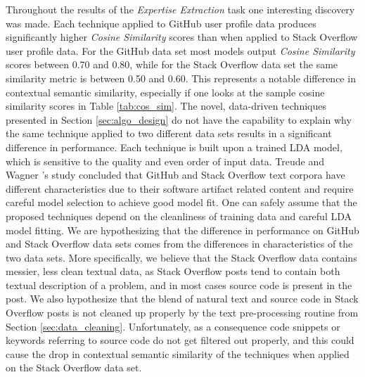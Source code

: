         Throughout the results of the \emph{Expertise Extraction} task one interesting discovery was made. Each technique applied to GitHub user profile data produces significantly higher \emph{Cosine Similarity} scores than when applied to Stack Overflow user profile data. For the GitHub data set most models output \emph{Cosine Similarity} scores between 0.70 and 0.80, while for the Stack Overflow data set the same similarity metric is between 0.50 and 0.60. This represents a notable difference in contextual semantic similarity, especially if one looks at the sample cosine similarity scores in Table \ref{tab:cos_sim}. The novel, data-driven techniques presented in Section \ref{sec:algo_design} do not have the capability to explain why the same technique applied to two different data sets results in a significant difference in performance. Each technique is built upon a trained LDA model, which is sensitive to the quality and even order of input data. Treude and Wagner \cite{treude2019predicting}'s study concluded that GitHub and Stack Overflow text corpora have different characteristics due to their software artifact related content and require careful model selection to achieve good model fit. One can safely assume that the proposed techniques depend on the cleanliness of training data and careful LDA model fitting. We are hypothesizing that the difference in performance on GitHub and Stack Overflow data sets comes from the differences in characteristics of the two data sets. More specifically, we believe that the Stack Overflow data contains messier, less clean textual data, as Stack Overflow posts tend to contain both textual description of a problem, and in most cases source code is present in the post. We also hypothesize that the blend of natural text and source code in Stack Overflow posts is not cleaned up properly by the text pre-processing routine from Section \ref{sec:data_cleaning}. Unfortunately, as a consequence code snippets or keywords referring to source code do not get filtered out properly, and this could cause the drop in contextual semantic similarity of the techniques when applied on the Stack Overflow data set.
        

